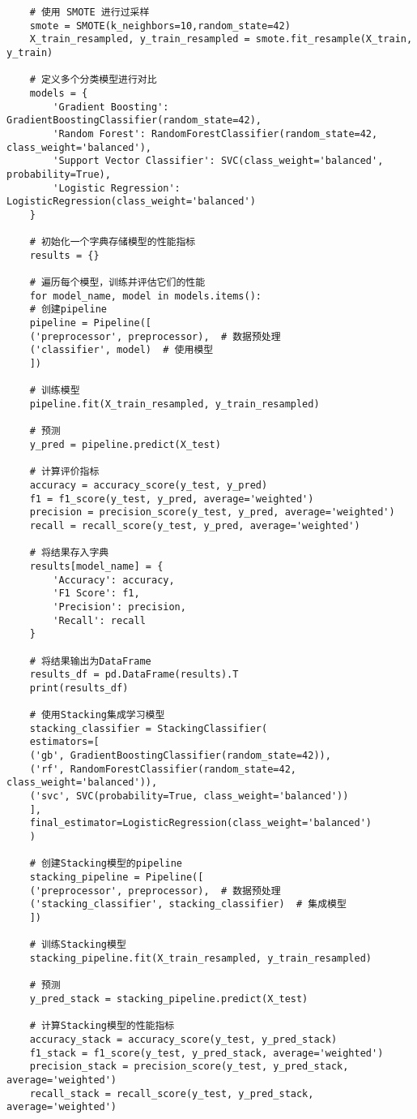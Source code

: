 \documentclass[bwprint]{gmcmthesis}
\begin{document}
\begin{lstlisting}
	# 使用 SMOTE 进行过采样
	smote = SMOTE(k_neighbors=10,random_state=42)
	X_train_resampled, y_train_resampled = smote.fit_resample(X_train, y_train)
	
	# 定义多个分类模型进行对比
	models = {
		'Gradient Boosting': GradientBoostingClassifier(random_state=42),
		'Random Forest': RandomForestClassifier(random_state=42, class_weight='balanced'),
		'Support Vector Classifier': SVC(class_weight='balanced', probability=True),
		'Logistic Regression': LogisticRegression(class_weight='balanced')
	}
	
	# 初始化一个字典存储模型的性能指标
	results = {}
	
	# 遍历每个模型，训练并评估它们的性能
	for model_name, model in models.items():
	# 创建pipeline
	pipeline = Pipeline([
	('preprocessor', preprocessor),  # 数据预处理
	('classifier', model)  # 使用模型
	])
	
	# 训练模型
	pipeline.fit(X_train_resampled, y_train_resampled)
	
	# 预测
	y_pred = pipeline.predict(X_test)
	
	# 计算评价指标
	accuracy = accuracy_score(y_test, y_pred)
	f1 = f1_score(y_test, y_pred, average='weighted')
	precision = precision_score(y_test, y_pred, average='weighted')
	recall = recall_score(y_test, y_pred, average='weighted')
	
	# 将结果存入字典
	results[model_name] = {
		'Accuracy': accuracy,
		'F1 Score': f1,
		'Precision': precision,
		'Recall': recall
	}
	
	# 将结果输出为DataFrame
	results_df = pd.DataFrame(results).T
	print(results_df)
	
	# 使用Stacking集成学习模型
	stacking_classifier = StackingClassifier(
	estimators=[
	('gb', GradientBoostingClassifier(random_state=42)),
	('rf', RandomForestClassifier(random_state=42, class_weight='balanced')),
	('svc', SVC(probability=True, class_weight='balanced'))
	],
	final_estimator=LogisticRegression(class_weight='balanced')
	)
	
	# 创建Stacking模型的pipeline
	stacking_pipeline = Pipeline([
	('preprocessor', preprocessor),  # 数据预处理
	('stacking_classifier', stacking_classifier)  # 集成模型
	])
	
	# 训练Stacking模型
	stacking_pipeline.fit(X_train_resampled, y_train_resampled)
	
	# 预测
	y_pred_stack = stacking_pipeline.predict(X_test)
	
	# 计算Stacking模型的性能指标
	accuracy_stack = accuracy_score(y_test, y_pred_stack)
	f1_stack = f1_score(y_test, y_pred_stack, average='weighted')
	precision_stack = precision_score(y_test, y_pred_stack, average='weighted')
	recall_stack = recall_score(y_test, y_pred_stack, average='weighted')
	

\end{lstlisting}
\end{document}
